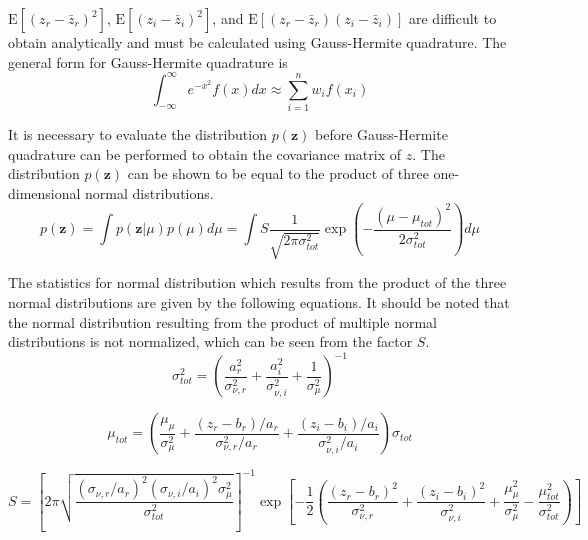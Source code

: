 \documentclass{article}         %
\theoremstyle{definition}
\theoremstyle{remark}
\begin{document}
$\mathrm{E}\left[\left(z_r - \bar{z}_r\right)^2\right]$, $\mathrm{E}\left[\left(z_i - \bar{z}_i\right)^2\right]$, and $\mathrm{E}\left[\left(z_r - \bar{z}_r\right)\left(z_i - \bar{z}_i\right)\right]$ are difficult to obtain analytically and must be calculated using Gauss-Hermite quadrature. The general form for Gauss-Hermite quadrature is
\begin{equation}
	\int_{-\infty}^{\infty}e^{-x^2}f\left(x\right)dx \approx \sum_{i=1}^n w_if\left(x_i\right)
\end{equation}

It is necessary to evaluate the distribution $p\left(\mathbf{z}\right)$ before Gauss-Hermite quadrature can be performed to obtain the covariance matrix of $z$. The distribution $p\left(\mathbf{z}\right)$ can be shown to be equal to the product of three one-dimensional normal distributions.
\begin{equation}
	p\left(\mathbf{z}\right) = \int p\left(\mathbf{z}|\mu\right)p\left(\mu\right)d\mu = \int S\frac{1}{\sqrt{2\pi\sigma_{tot}^2}}\exp\left(-\frac{\left(\mu - \mu_{tot}\right)^2}{2\sigma_{tot}^2}\right)d\mu
\end{equation}

The statistics for normal distribution which results from the product of the three normal distributions are given by the following equations. It should be noted that the normal distribution resulting from the product of multiple normal distributions is not normalized, which can be seen from the factor $S$.
\begin{equation}
	\sigma_{tot}^2 = \left(\frac{a_r^2}{\sigma_{\nu,r}^2} + \frac{a_i^2}{\sigma_{\nu,i}^2} + \frac{1}{\sigma_\mu^2}\right)^{-1}
\end{equation}

\begin{equation}
	\mu_{tot} = \left(\frac{\mu_\mu}{\sigma_\mu^2} + \frac{\left(z_r - b_r\right)/a_r}{\sigma_{\nu,r}^2/a_r} + \frac{\left(z_i - b_i\right)/a_i}{\sigma_{\nu,i}^2/a_i}\right)\sigma_{tot}
\end{equation}

\begin{equation}
	S = \left[2\pi\sqrt{\frac{\left(\sigma_{\nu,r}/a_r\right)^2\left(\sigma_{\nu,i}/a_i\right)^2\sigma_\mu^2}{\sigma_{tot}^2}}\right]^{-1}\exp\left[-\frac{1}{2}\left(\frac{\left(z_r - b_r\right)^2}{\sigma_{\nu,r}^2} + \frac{\left(z_i - b_i\right)^2}{\sigma_{\nu,i}^2} + \frac{\mu_\mu^2}{\sigma_\mu^2} - \frac{\mu_{tot}^2}{\sigma_{tot}^2}\right)\right]
\end{equation}
\end{document}

